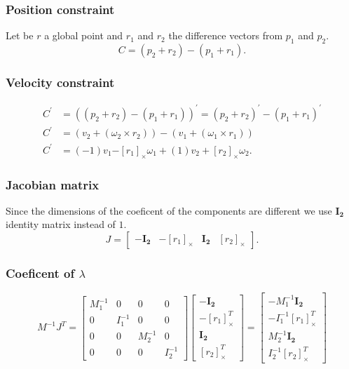 \documentclass{article}
\begin{document}
	\subsubsection{Position constraint}
	Let be $r$ a global point and $r_1$ and $r_2$ the difference vectors from $p_1$ and $p_2$.
	$$
		C=(p_2+r_2)-(p_1+r_1).
	$$
	\subsubsection{Velocity constraint}
	\begin{align}
		C^{'}&=((p_2+r_2)-(p_1+r_1))^{'} = (p_2+r_2)^{'}-(p_1+r_1)^{'}\\
		C^{'}&=(v_2+(\omega_2\times r_2))-(v_1+(\omega_1\times r_1))\\
		C^{'}&=\boxed{(-1)} v_1\boxed{-[r_1]_\times}\omega_1+\boxed{(1)}v_2+\boxed{[r_2]_\times}\omega_2.
	\end{align}
	\subsubsection{Jacobian matrix}
	Since the dimensions of the coeficent of the components are different we use $\boldsymbol{I_2}$ identity matrix instead of $1$.
	$$ J=
		\begin{bmatrix}
	 		-\boldsymbol{I_2} & -[r_1]_\times & \boldsymbol{I_2} & [r_2]_\times
		\end{bmatrix}.
	$$
	\subsubsection{Coeficent of $\lambda$}
	$$
		M^{-1}J^T=	
		\begin{bmatrix}
			M_1^{-1} 	& 0 		& 0 		& 0\\
			0 			& I_1^{-1} 	& 0 		& 0\\
			0 			& 0 		& M_2^{-1} 	& 0\\
			0 			& 0 		& 0 		& I_2^{-1}
		\end{bmatrix}
		\begin{bmatrix}
			\boldsymbol{-I_2}\\
			-[r_1]_\times^T\\
			\boldsymbol{I_2}\\
			[r_2]_\times^T
		\end{bmatrix}
		=
		\begin{bmatrix}
			-M_1^{-1}\boldsymbol{I_2}\\
			-I_1^{-1}[r_1]_\times^T\\
			M_2^{-1}\boldsymbol{I_2}\\
			I_2^{-1}[r_2]_\times^T
		\end{bmatrix}
	$$
\end{document}
